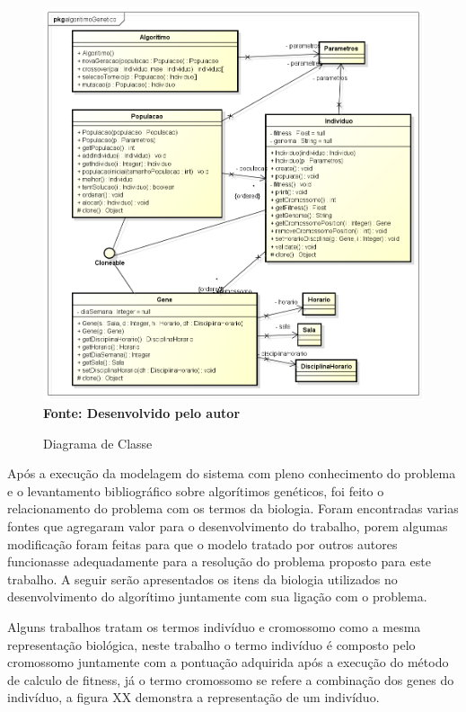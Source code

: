 \documentclass{abntpuc}
\begin{document}
\begin{figure}[!htb]
\caption[Diagrama de Classe]{Diagrama de Classe}
\label{fig:figura3}
\centering
\includegraphics[scale=0.6]{imagens/diagramaClasse.png}
\\ \textbf{\footnotesize Fonte: Desenvolvido pelo autor}
\end{figure}


Após a execução da modelagem do sistema com pleno conhecimento do problema e o levantamento bibliográfico sobre algorítimos genéticos, foi feito o relacionamento do problema com os termos da biologia. Foram encontradas varias fontes que agregaram valor para o desenvolvimento do trabalho, porem algumas modificação foram feitas para que o modelo tratado por outros autores funcionasse adequadamente para a resolução do problema proposto para este trabalho. A seguir serão apresentados os itens da biologia utilizados no desenvolvimento do algorítimo juntamente com sua ligação com o problema.\par


Alguns trabalhos tratam os termos indivíduo e cromossomo como a mesma representação biológica, neste trabalho o termo indivíduo é composto pelo cromossomo juntamente com a pontuação adquirida após a execução do método de calculo de fitness, já o termo cromossomo se refere a combinação dos genes do indivíduo, a figura XX demonstra a representação de um indivíduo.\par
\end{document}

